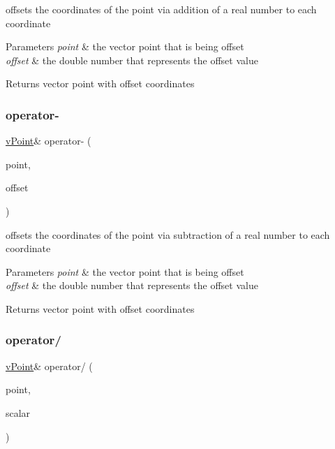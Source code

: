 offsets the coordinates of the point via addition of a real number to each coordinate 
\begin{DoxyParams}{Parameters}
{\em point} & the vector point that is being offset \\
\hline
{\em offset} & the double number that represents the offset value \\
\hline
\end{DoxyParams}
\begin{DoxyReturn}{Returns}
vector point with offset coordinates 
\end{DoxyReturn}
\mbox{\label{classv_point_a989b20bf1e5537591771480106d3e641}} 
\subsubsection{\texorpdfstring{operator-\/}{operator-}}
{\footnotesize\ttfamily \hyperlink{classv_point}{v\+Point}\& operator-\/ (\begin{DoxyParamCaption}\item[{const \hyperlink{classv_point}{v\+Point} \&}]{point,  }\item[{double}]{offset }\end{DoxyParamCaption})\hspace{0.3cm}{\ttfamily [friend]}}

offsets the coordinates of the point via subtraction of a real number to each coordinate 
\begin{DoxyParams}{Parameters}
{\em point} & the vector point that is being offset \\
\hline
{\em offset} & the double number that represents the offset value \\
\hline
\end{DoxyParams}
\begin{DoxyReturn}{Returns}
vector point with offset coordinates 
\end{DoxyReturn}
\mbox{\label{classv_point_a71cb80dbf2851ffff4e92b87e38a3aaf}} 
\subsubsection{\texorpdfstring{operator/}{operator/}}
{\footnotesize\ttfamily \hyperlink{classv_point}{v\+Point}\& operator/ (\begin{DoxyParamCaption}\item[{const \hyperlink{classv_point}{v\+Point} \&}]{point,  }\item[{double}]{scalar }\end{DoxyParamCaption})\hspace{0.3cm}{\ttfamily [friend]}}


